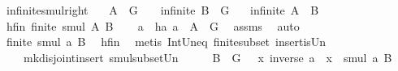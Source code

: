 \begin{isabellebody}
{\isafoldproof}%
%
\isadelimproof
\isanewline
%
\endisadelimproof
\isanewline
\isanewline
{}\isamarkupfalse%
\ infinite{\isacharunderscore}{\kern0pt}smul{\isacharunderscore}{\kern0pt}right{\isacharcolon}{\kern0pt}\isanewline
\ \ \ {\isachardoublequoteopen}A\ {\isasyminter}\ G\ {\isasymnoteq}\ {\isacharbraceleft}{\kern0pt}{\isacharbraceright}{\kern0pt}{\isachardoublequoteclose}\ \ {\isachardoublequoteopen}infinite\ {\isacharparenleft}{\kern0pt}B\ {\isasyminter}\ G{\isacharparenright}{\kern0pt}{\isachardoublequoteclose}\isanewline
\ \ \ {\isachardoublequoteopen}infinite\ {\isacharparenleft}{\kern0pt}A\ {\isasymcdots}\ B{\isacharparenright}{\kern0pt}{\isachardoublequoteclose}\ \isanewline
%
\isadelimproof
%
\endisadelimproof
%
\isatagproof
{}\isamarkupfalse%
\isanewline
\ \ \isamarkupfalse%
\ hfin{\isacharcolon}{\kern0pt}\ {\isachardoublequoteopen}finite\ {\isacharparenleft}{\kern0pt}smul\ A\ B{\isacharparenright}{\kern0pt}{\isachardoublequoteclose}\isanewline
\ \ \isamarkupfalse%
\ a\ \ ha{\isacharcolon}{\kern0pt}\ {\isachardoublequoteopen}a\ {\isasymin}\ A\ {\isasyminter}\ G{\isachardoublequoteclose}\ \isamarkupfalse%
\ assms\ \isamarkupfalse%
\ auto\isanewline
\ \ \isamarkupfalse%
\ \isamarkupfalse%
\ {\isachardoublequoteopen}finite\ {\isacharparenleft}{\kern0pt}smul\ {\isacharbraceleft}{\kern0pt}a{\isacharbraceright}{\kern0pt}\ B{\isacharparenright}{\kern0pt}{\isachardoublequoteclose}\ \isamarkupfalse%
\ hfin\ \isamarkupfalse%
\ {\isacharparenleft}{\kern0pt}metis\ Int{\isacharunderscore}{\kern0pt}Un{\isacharunderscore}{\kern0pt}eq{\isacharparenleft}{\kern0pt}{}{\isacharparenright}{\kern0pt}\ finite{\isacharunderscore}{\kern0pt}subset\ insert{\isacharunderscore}{\kern0pt}is{\isacharunderscore}{\kern0pt}Un\ \isanewline
\ \ \ \ mk{\isacharunderscore}{\kern0pt}disjoint{\isacharunderscore}{\kern0pt}insert\ smul{\isacharunderscore}{\kern0pt}subset{\isacharunderscore}{\kern0pt}Un{\isacharparenleft}{\kern0pt}{}{\isacharparenright}{\kern0pt}{\isacharparenright}{\kern0pt}\isanewline
\ \ \isamarkupfalse%
\ \isamarkupfalse%
\ {\isachardoublequoteopen}B\ {\isasyminter}\ G\ {\isasymsubseteq}\ {\isacharparenleft}{\kern0pt}{\isasymlambda}\ x{\isachardot}{\kern0pt}\ inverse\ a\ {\isasymcdot}\ x{\isacharparenright}{\kern0pt}\ {\isacharbackquote}{\kern0pt}\ smul\ {\isacharbraceleft}{\kern0pt}a{\isacharbraceright}{\kern0pt}\ B{\isachardoublequoteclose}\ \isanewline

\end{isabellebody}
